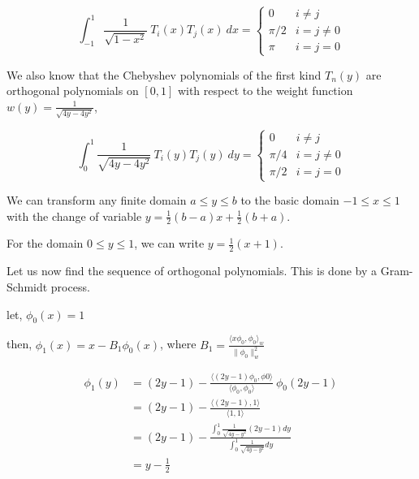 \documentclass[a4paper,11pt]{report}
\begin{document}
\begin{enumerate}
\begin{itemize}
    \begin{equation*}
    \int_{-1}^{1} \frac{1}{\sqrt{1 - x^2}}\ T_{i}(x) T_{j}(x)\ dx = 
    \begin{cases}
        0 & i \neq j \\
        \pi/2 & i = j \neq 0 \\
        \pi & i = j = 0
    \end{cases}
    \end{equation*}

    We also know that the Chebyshev polynomials of the first kind $T_{n}(y)$ are orthogonal polynomials on $[0,1]$ with respect to the weight function
    $w(y) = \displaystyle \frac{1}{\sqrt{4y - 4y^2}}$,

    \begin{equation*}
    \int_{0}^{1} \frac{1}{\sqrt{4y - 4y^2}}\ T_{i}(y) T_{j}(y)\ dy = 
    \begin{cases}
        0 & i \neq j \\
        \pi/4 & i = j \neq 0 \\
        \pi/2 & i = j = 0
    \end{cases}
    \end{equation*}

    We can transform any finite domain $a \le y \le b$ to the basic domain $-1 \le x \le 1$ with the change of variable
    $y = \displaystyle \frac{1}{2} (b - a)x + \frac{1}{2} (b + a)$.

    For the domain $0 \le y \le 1$, we can write $y = \displaystyle \frac{1}{2} (x + 1)$.
    
    Let us now find the sequence of orthogonal polynomials. This is done by a Gram-Schmidt process. 

    let, $\phi_{0}(x) = 1$

    then, $\phi_{1}(x) = x - B_{1} \phi_{0}(x)$, where $B_{1} = \displaystyle \frac{\langle x \phi_{0}, \phi_{0} \rangle_{w}}{\| \phi_{0} \|_{w}^{2}}$
    
    \begin{equation*}
    \begin{aligned}
    \phi_{1}(y) &= (2y-1) - \displaystyle \frac{\langle (2y-1) \phi_{0}, \phi{0} \rangle}{\langle \phi_{0}, \phi_{0} \rangle}\ \phi_{0}(2y-1) \\
                &= (2y-1) - \displaystyle \frac{\langle (2y-1), 1 \rangle}{\langle 1, 1 \rangle} \\
                &= (2y-1) - \displaystyle \frac{\displaystyle\int_{0}^{1} \frac{1}{\sqrt{4y-y^2}} (2y-1) dy}{\displaystyle\int_{0}^{1} \frac{1}{\sqrt{4y-y^2}} dy} \\
                &= y - \frac{1}{2}
    \end{aligned}
    \end{equation*}


\end{itemize}
\end{enumerate}
\end{document}
